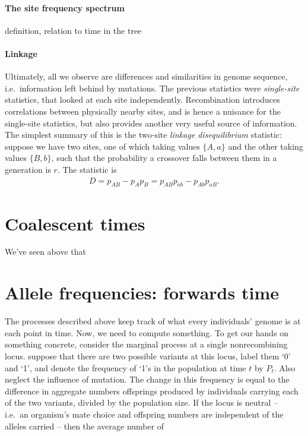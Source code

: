 \paragraph{The site frequency spectrum}
definition, relation to time in the tree



\paragraph{Linkage}
Ultimately, all we observe are differences and similarities in genome sequence,
i.e.\ information left behind by mutations.
The previous statistics were \emph{single-site} statistics,
that looked at each site independently.
Recombination introduces correlations between physically nearby sites,
and is hence a nuisance for the single-site statistics,
but also provides another very useful source of information.
The simplest summary of this is the two-site \emph{linkage disequilibrium} statistic:
suppose we have two sites, one of which taking values $\{A,a\}$ and the other taking values $\{B,b\}$,
such that the probability a crossover falls between them in a generation is $r$.
The statistic is
\begin{align}
  D = p_{AB} - p_A p_B = p_{AB}p_{ab} - p_{Ab}p_{aB} .
\end{align}




\section{Coalescent times}
We've seen above that 



\section{Allele frequencies: forwards time}

The processes described above keep track of what every individuals' genome is at each point in time.
Now, we need to compute something.
To get our hands on something concrete, consider the marginal process at a single nonrecombining locus.
suppose that there are two possible variants at this locus,
label them `0' and `1',
and denote the frequency of `1's in the population at time $t$ by $P_t$.
Also neglect the influence of mutation.
The change in this frequency is equal to the difference in aggregate numbers offsprings produced by individuals 
carrying each of the two variants,
divided by the population size.
If the locus is neutral
-- i.e.\ an organism's mate choice and offspring numbers are independent of the alleles carried --
then the average number of 

